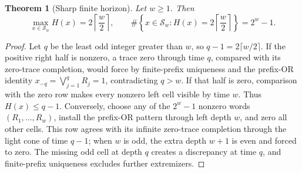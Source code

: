 \documentclass[11pt]{article}
\newtheorem{theorem}{Theorem}[section]
\theoremstyle{definition}
\begin{document}
\begin{theorem}[Sharp finite horizon]\label{thm:horizon}
Let $w\ge1$. Then
\begin{equation}
 \max_{x\in\mathcal S_w}H(x)=2\left\lceil\frac w2\right\rceil,\qquad
 \#\!\left\{x\in\mathcal S_w:H(x)=2\left\lceil\frac w2\right\rceil\right\}=2^w-1.
\end{equation}
\end{theorem}
\begin{proof}
Let $q$ be the least odd integer greater than $w$, so $q-1=2\lceil w/2\rceil$.
If the positive right half is nonzero, a trace zero through time $q$, compared
with its zero-trace completion, would force by finite-prefix uniqueness and
the prefix-OR identity $x_{-q}=\bigvee_{j=1}^qR_j=1$, contradicting $q>w$. If
that half is zero, comparison with the zero row makes every nonzero left cell
visible by time $w$. Thus $H(x)\le q-1$. Conversely, choose any of the $2^w-1$
nonzero words $(R_1,\dots,R_w)$, install the prefix-OR pattern through left
depth $w$, and zero all other cells. This row agrees with its infinite
zero-trace completion through the light cone of time $q-1$; when $w$ is odd,
the extra depth $w+1$ is even and forced to zero. The missing odd cell at depth
$q$ creates a discrepancy at time $q$, and finite-prefix uniqueness excludes
further extremizers.
\end{proof}
\end{document}
